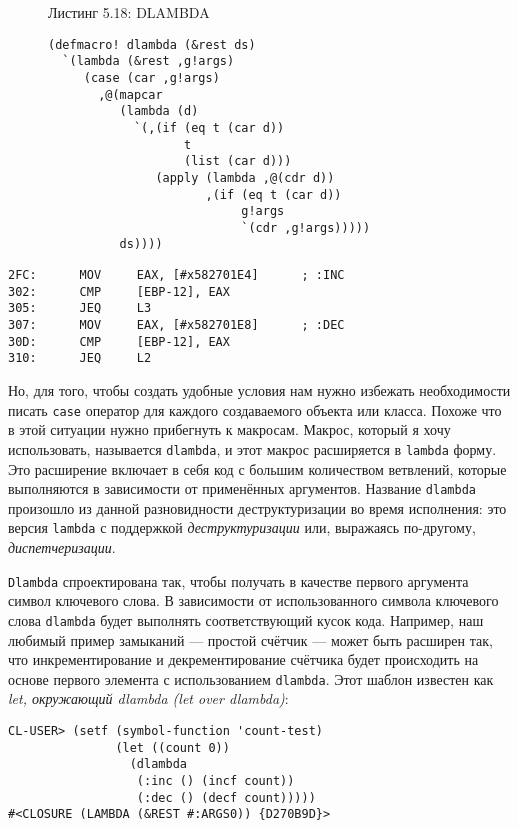\begin{figure}Листинг 5.18: DLAMBDA\label{listing_5.18}
\listbegin
\begin{verbatim}
(defmacro! dlambda (&rest ds)
  `(lambda (&rest ,g!args)
     (case (car ,g!args)
       ,@(mapcar
          (lambda (d)
            `(,(if (eq t (car d))
                   t
                   (list (car d)))
               (apply (lambda ,@(cdr d))
                      ,(if (eq t (car d))
                           g!args
                           `(cdr ,g!args)))))
          ds))))
\end{verbatim}
\listend
\end{figure}

\begin{verbatim}
2FC:      MOV     EAX, [#x582701E4]      ; :INC
302:      CMP     [EBP-12], EAX
305:      JEQ     L3
307:      MOV     EAX, [#x582701E8]      ; :DEC
30D:      CMP     [EBP-12], EAX
310:      JEQ     L2
\end{verbatim}

Но, для того, чтобы создать удобные условия нам нужно избежать необходимости писать \verb"case" оператор для каждого создаваемого объекта или класса. Похоже что в этой ситуации нужно прибегнуть к макросам. Макрос, который я хочу использовать, называется \verb"dlambda", и этот макрос расширяется в \verb"lambda" форму. Это расширение включает в себя код с большим количеством ветвлений, которые выполняются в зависимости от применённых аргументов. Название \verb"dlambda" произошло из данной разновидности деструктуризации во время исполнения: это версия \verb"lambda" с поддержкой \emph{деструктуризации} или, выражаясь по-другому, \emph{диспетчеризации}.

\verb"Dlambda" спроектирована так, чтобы получать в качестве первого аргумента символ ключевого слова. В зависимости от использованного символа ключевого слова \verb"dlambda" будет выполнять соответствующий кусок кода. Например, наш любимый пример замыканий --- простой счётчик --- может быть расширен так, что инкрементирование и декрементирование счётчика будет происходить на основе первого элемента с использованием \verb"dlambda". Этот шаблон известен как \emph{let, окружающий dlambda (let over dlambda)}:

\begin{verbatim}
CL-USER> (setf (symbol-function 'count-test)
               (let ((count 0))
                 (dlambda
                  (:inc () (incf count))
                  (:dec () (decf count)))))
#<CLOSURE (LAMBDA (&REST #:ARGS0)) {D270B9D}>
\end{verbatim}

